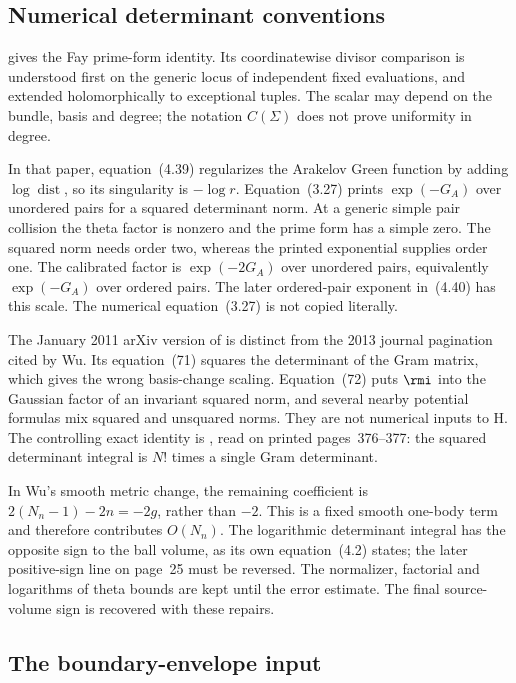 \subsection{Numerical determinant conventions}

\cite[Proposition~3.2]{Klevtsov19LaughlinV3} gives the Fay
prime-form identity. Its coordinatewise divisor comparison
is understood first on the generic locus of independent
fixed evaluations, and extended holomorphically to exceptional
tuples. The scalar may depend on the bundle, basis and degree;
the notation $C(\Sigma)$ does not prove uniformity in degree.

In that paper, equation~(4.39) regularizes the Arakelov Green
function by adding $\log\operatorname{dist}$, so its singularity
is $-\log r$. Equation~(3.27) prints $\exp(-G_A)$ over
unordered pairs for a squared determinant norm. At a generic
simple pair collision the theta factor is nonzero and the
prime form has a simple zero. The squared norm needs order
two, whereas the printed exponential supplies order one.
The calibrated factor is $\exp(-2G_A)$ over unordered pairs,
equivalently $\exp(-G_A)$ over ordered pairs. The later
ordered-pair exponent in~(4.40) has this scale. The numerical
equation~(3.27) is not copied literally.

The January 2011 arXiv version of \cite{Zelditch11ZerosV1}
is distinct from the 2013 journal pagination cited by Wu.
Its equation~(71) squares the determinant of the Gram matrix,
which gives the wrong basis-change scaling. Equation~(72)
puts $\rmi$ into the Gaussian factor of an invariant squared
norm, and several nearby potential formulas mix squared
and unsquared norms. They are not numerical inputs to H.
The controlling exact identity is \cite[Lemma~5.3]{BB10},
read on printed pages~376--377: the squared determinant
integral is $N!$ times a single Gram determinant.

In Wu's smooth metric change, the remaining coefficient
is $2(N_n-1)-2n=-2g$, rather than $-2$. This is a fixed
smooth one-body term and therefore contributes $O(N_n)$.
The logarithmic determinant integral has the opposite sign
to the ball volume, as its own equation~(4.2) states; the
later positive-sign line on page~25 must be reversed. The
normalizer, factorial and logarithms of theta bounds are
kept until the error estimate. The final source-volume
sign is recovered with these repairs.

\subsection{The boundary-envelope input}

